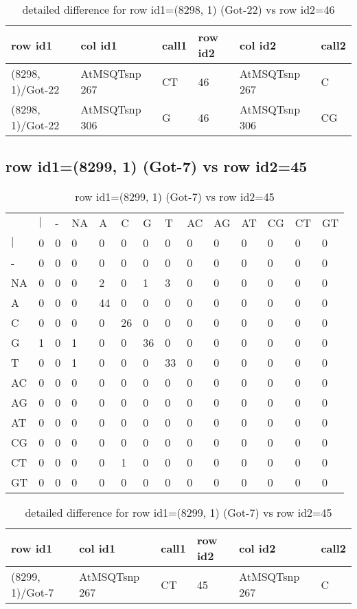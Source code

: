 \begin{center}
\begin{longtable}{|l|l|l|l|l|l|}
\caption{detailed difference for row id1=(8298, 1) (Got-22) vs row id2=46} \label{table_dm275}\\
\hline
row id1&col id1&call1&row id2&col id2&call2\\
\hline
(8298, 1)/Got-22&AtMSQTsnp 267&CT&46&AtMSQTsnp 267&C\\
(8298, 1)/Got-22&AtMSQTsnp 306&G&46&AtMSQTsnp 306&CG\\
\hline
\end{longtable}
\end{center}

\subsection{row id1=(8299, 1) (Got-7) vs row id2=45}
\begin{center}
\begin{longtable}{|l|l|l|l|l|l|l|l|l|l|l|l|l|l|}
\caption{row id1=(8299, 1) (Got-7) vs row id2=45} \label{table_dm276}\\
\hline
\\
\hline
&$|$&-&NA&A&C&G&T&AC&AG&AT&CG&CT&GT\\
$|$&0&0&0&0&0&0&0&0&0&0&0&0&0\\
-&0&0&0&0&0&0&0&0&0&0&0&0&0\\
NA&0&0&0&2&0&1&3&0&0&0&0&0&0\\
A&0&0&0&44&0&0&0&0&0&0&0&0&0\\
C&0&0&0&0&26&0&0&0&0&0&0&0&0\\
G&1&0&1&0&0&36&0&0&0&0&0&0&0\\
T&0&0&1&0&0&0&33&0&0&0&0&0&0\\
AC&0&0&0&0&0&0&0&0&0&0&0&0&0\\
AG&0&0&0&0&0&0&0&0&0&0&0&0&0\\
AT&0&0&0&0&0&0&0&0&0&0&0&0&0\\
CG&0&0&0&0&0&0&0&0&0&0&0&0&0\\
CT&0&0&0&0&1&0&0&0&0&0&0&0&0\\
GT&0&0&0&0&0&0&0&0&0&0&0&0&0\\
\hline
\end{longtable}
\end{center}

\begin{center}
\begin{longtable}{|l|l|l|l|l|l|}
\caption{detailed difference for row id1=(8299, 1) (Got-7) vs row id2=45} \label{table_dm277}\\
\hline
row id1&col id1&call1&row id2&col id2&call2\\
\hline
(8299, 1)/Got-7&AtMSQTsnp 267&CT&45&AtMSQTsnp 267&C\\
\hline
\end{longtable}
\end{center}

